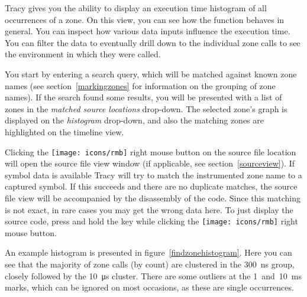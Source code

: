 \documentclass[hidelinks,titlepage,a4paper,twoside]{article}
\newcommand{\RMB}{\texttt{[image: icons/rmb]}}
\begin{document}
Tracy gives you the ability to display an execution time histogram of all occurrences of a zone. On this view, you can see how the function behaves in general. You can inspect how various data inputs influence the execution time. You can filter the data to eventually drill down to the individual zone calls to see the environment in which they were called.

You start by entering a search query, which will be matched against known zone names (see section~\ref{markingzones} for information on the grouping of zone names). If the search found some results, you will be presented with a list of zones in the \emph{matched source locations} drop-down. The selected zone's graph is displayed on the \emph{histogram} drop-down, and also the matching zones are highlighted on the timeline view.

Clicking the \RMB{} right mouse button on the source file location will open the source file view window (if applicable, see section~\ref{sourceview}). If symbol data is available Tracy will try to match the instrumented zone name to a captured symbol. If this succeeds and there are no duplicate matches, the source file view will be accompanied by the disassembly of the code. Since this matching is not exact, in rare cases you may get the wrong data here. To just display the source code, press and hold the \keys{\ctrl} key while clicking the \RMB{} right mouse button.

An example histogram is presented in figure~\ref{findzonehistogram}. Here you can see that the majority of zone calls (by count) are clustered in the 300~\si{\nano\second} group, closely followed by the 10~\si{\micro\second} cluster. There are some outliers at the 1~and~10~\si{\milli\second} marks, which can be ignored on most occasions, as these are single occurrences.
\end{document}
